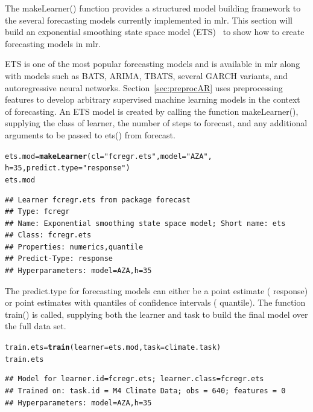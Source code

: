 \documentclass[12pt]{article}\usepackage[]{graphicx}\usepackage[]{color}
\makeatletter
\newcommand{\hlnum}[1]{\textcolor[rgb]{0.686,0.059,0.569}{#1}}%
\newcommand{\hlstr}[1]{\textcolor[rgb]{0.192,0.494,0.8}{#1}}%
\newcommand{\hlstd}[1]{\textcolor[rgb]{0.345,0.345,0.345}{#1}}%
\newcommand{\hlkwb}[1]{\textcolor[rgb]{0.69,0.353,0.396}{#1}}%
\newcommand{\hlkwc}[1]{\textcolor[rgb]{0.333,0.667,0.333}{#1}}%
\newcommand{\hlkwd}[1]{\textcolor[rgb]{0.737,0.353,0.396}{\textbf{#1}}}%
\newenvironment{kframe}{%
 \def\at@end@of@kframe{}%
 \ifinner\ifhmode%
  \def\at@end@of@kframe{\end{minipage}}%
  \begin{minipage}{\columnwidth}%
 \fi\fi%
 \def\FrameCommand##1{\hskip\@totalleftmargin \hskip-\fboxsep
 \colorbox{shadecolor}{##1}\hskip-\fboxsep
     \hskip-\linewidth \hskip-\@totalleftmargin \hskip\columnwidth}%
 \MakeFramed {\advance\hsize-\width
   \@totalleftmargin\z@ \linewidth\hsize
   \@setminipage}}%
 {\par\unskip\endMakeFramed%
 \at@end@of@kframe}
\newenvironment{knitrout}{}{} %
\theoremstyle{definition}
\newcommand\code{\@codex}
\def\@codex#1{{\normalfont\ttfamily\hyphenchar\font=-1 #1}}
\newcommand{\pkg}[1]{{\fontseries{b}\selectfont #1}}
\makeatother
\begin{document}
The \code{makeLearner()} function provides a structured model building framework to the several forecasting models currently implemented in \pkg{mlr}. This section will build an exponential smoothing state space model (ETS)~\cite{etsMod} to show how to create forecasting models in \pkg{mlr}.

ETS is one of the most popular forecasting models and is available in \pkg{mlr} along with models such as BATS, ARIMA, TBATS, several GARCH variants, and autoregressive neural networks. Section~\ref{sec:preprocAR} uses preprocessing features to develop arbitrary supervised machine learning models in the context of forecasting. An ETS model is created by calling the function \code{makeLearner()}, supplying the class of learner, the number of steps to forecast, and any additional arguments to be passed to \code{ets()} from \pkg{forecast}.

\singlespacing
\begin{knitrout}
\color{fgcolor}\begin{kframe}
\begin{alltt}
\hlstd{ets.mod} \hlkwb{=}\hlkwd{makeLearner}\hlstd{(}\hlkwc{cl} \hlstd{=} \hlstr{"fcregr.ets"}\hlstd{,} \hlkwc{model} \hlstd{=} \hlstr{"AZA"}\hlstd{,}
                     \hlkwc{h} \hlstd{=} \hlnum{35}\hlstd{,} \hlkwc{predict.type} \hlstd{=} \hlstr{"response"}\hlstd{)}
\hlstd{ets.mod}
\end{alltt}
\begin{verbatim}
## Learner fcregr.ets from package forecast
## Type: fcregr
## Name: Exponential smoothing state space model; Short name: ets
## Class: fcregr.ets
## Properties: numerics,quantile
## Predict-Type: response
## Hyperparameters: model=AZA,h=35
\end{verbatim}
\end{kframe}
\end{knitrout}
\doublespacing

The \code{predict.type} for forecasting models can either be a point estimate (\code{response}) or point estimates with quantiles of confidence intervals (\code{quantile}). The function \code{train()} is called, supplying both the learner and task to build the final model over the full data set.

\singlespace
\begin{knitrout}
\color{fgcolor}\begin{kframe}
\begin{alltt}
\hlstd{train.ets} \hlkwb{=} \hlkwd{train}\hlstd{(}\hlkwc{learner} \hlstd{= ets.mod,} \hlkwc{task} \hlstd{= climate.task )}
\hlstd{train.ets}
\end{alltt}
\begin{verbatim}
## Model for learner.id=fcregr.ets; learner.class=fcregr.ets
## Trained on: task.id = M4 Climate Data; obs = 640; features = 0
## Hyperparameters: model=AZA,h=35
\end{verbatim}
\end{kframe}
\end{knitrout}
\doublespace
\end{document}
